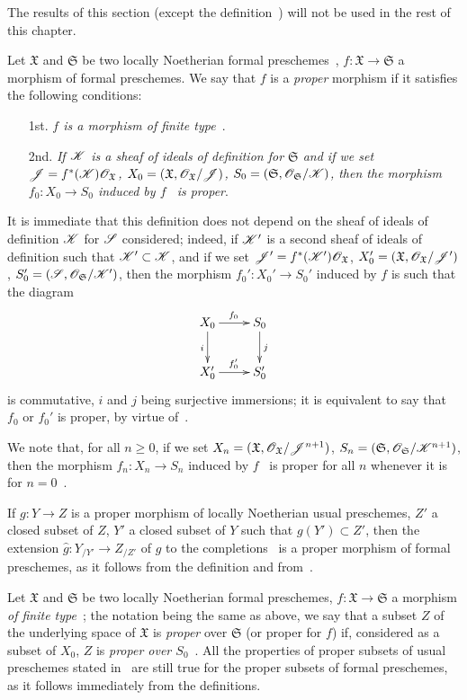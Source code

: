 The results of this section (except the definition~) will not be used in the rest of this chapter.

\begin{env}[3.4.1]
\label{3.3.4.1}
Let $\mathfrak{X}$ and $\mathfrak{S}$ be two locally Noetherian formal preschemes~, $f:\mathfrak{X}\to\mathfrak{S}$ a morphism of formal preschemes.
We say that $f$ is a \emph{proper} morphism if it satisfies the following conditions:
\begin{enumerate}
  \item[1st.] \emph{$f$ is a morphism of finite type~}.
  \item[2nd.] \emph{If $\mathscr{K}$ is a sheaf of ideals of definition for $\mathfrak{S}$ and if we set $\mathscr{J}=f^*(\mathscr{K})\mathscr{O}_\mathfrak{X}$, $X_0=(\mathfrak{X},\mathscr{O}_\mathfrak{X}/\mathscr{J})$, $S_0=(\mathfrak{S},\mathscr{O}_\mathfrak{S}/\mathscr{K})$, then the morphism $f_0:X_0\to S_0$ induced by $f$~ is proper}.
\end{enumerate}
It is immediate that this definition does not depend on the sheaf of ideals of definition $\mathscr{K}$ for $\mathscr{S}$ considered; indeed, if $\mathscr{K}'$ is a second sheaf of ideals of definition such that $\mathscr{K}'\subset\mathscr{K}$, and if we set $\mathscr{J}'=f^*(\mathscr{K}')\mathscr{O}_\mathfrak{X}$, $X_0'=(\mathfrak{X},\mathscr{O}_\mathfrak{X}/\mathscr{J}')$, $S_0'=(\mathscr{S},\mathscr{O}_\mathfrak{S}/\mathscr{K}')$, then the morphism $f_0':X_0'\to S_0'$ induced by $f$ is such that the diagram
\[
  \xymatrix{
    X_0\ar[r]^{f_0}\ar[d]_i &
    S_0\ar[d]^j\\
    X_0'\ar[r]^{f_0'} &
    S_0'
  }
\]
is commutative, $i$ and $j$ being surjective immersions; it is equivalent to say that $f_0$ or $f_0'$ is proper, by virtue of~.

We note that, for all $n\geq 0$, if we set $X_n=(\mathfrak{X},\mathscr{O}_\mathfrak{X}/\mathscr{J}^{n+1})$, $S_n=(\mathfrak{S},\mathscr{O}_\mathfrak{S}/\mathscr{K}^{n+1})$, then the morphism $f_n:X_n\to S_n$ induced by $f$~ is proper for all $n$ whenever it is for $n=0$~.

If $g:Y\to Z$ is a proper morphism of locally Noetherian usual preschemes, $Z'$ a closed subset of $Z$, $Y'$ a closed subset of $Y$ such that $g(Y')\subset Z'$, then the extension $\widehat{g}:Y_{/Y'}\to Z_{/Z'}$ of $g$ to the completions~ is a proper morphism of formal preschemes, as it follows from the definition and from~.

Let $\mathfrak{X}$ and $\mathfrak{S}$ be two locally Noetherian formal preschemes, $f:\mathfrak{X}\to\mathfrak{S}$ a morphism \emph{of finite type}~; the notation being the same as above, we say that a subset $Z$ of the underlying space of $\mathfrak{X}$ is \emph{proper} over $\mathfrak{S}$ (or proper for $f$) if, considered as a subset of $X_0$, $Z$ is \emph{proper over $S_0$}~.
All the properties of proper subsets of usual preschemes stated in~ are still true for the proper subsets of formal preschemes, as it follows immediately from the definitions.
\end{env}

